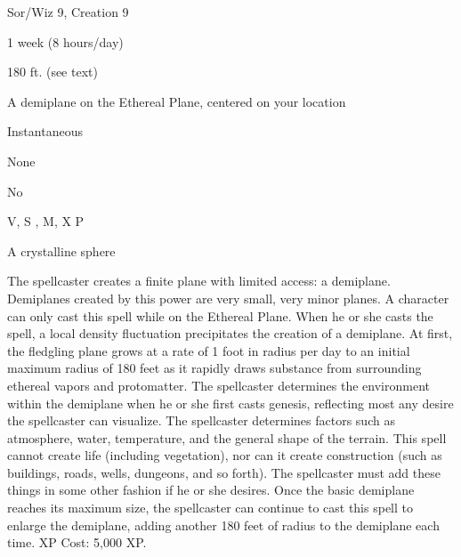 
\begin{description*}
\item[Level:] Sor/Wiz 9, Creation 9
\item[Casting Time:] 1 week (8 hours/day)
\item[Range:] 180 ft. (see text)
\item[Effect:] A demiplane on the Ethereal Plane, centered on your location
\item[Duration:] Instantaneous
\item[Saving Throw:] None
\item[Spell Resistance:] No
\item[Components:] V, S , M, X P
\item[Arcane Material Component:] A crystalline sphere
\end{description*}

The spellcaster creates a finite plane with limited access: a demiplane. Demiplanes created by this power are very small, very minor planes.
A character can only cast this spell while on the Ethereal Plane. When he or she casts the spell, a local density fluctuation precipitates the creation of a demiplane. At first, the fledgling plane grows at a rate of 1 foot in radius per day to an initial maximum radius of 180 feet as it rapidly draws substance from surrounding ethereal vapors and protomatter.
The spellcaster determines the environment within the demiplane when he or she first casts genesis, reflecting most any desire the spellcaster can visualize. The spellcaster determines factors such as atmosphere, water, temperature, and the general shape of the terrain. This spell cannot create life (including vegetation), nor can it create construction (such as buildings, roads, wells, dungeons, and so forth). The spellcaster must add these things in some other fashion if he or she desires. Once the basic demiplane reaches its maximum size, the spellcaster can continue to cast this spell to enlarge the demiplane, adding another 180 feet of radius to the demiplane each time.
XP Cost: 5,000 XP.